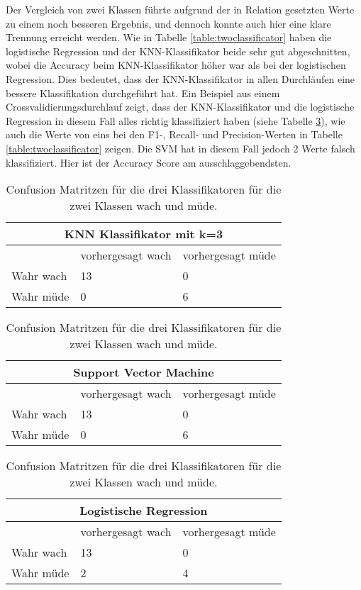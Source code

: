 Der Vergleich von zwei Klassen führte aufgrund der in Relation gesetzten Werte zu einem noch besseren Ergebnis, und dennoch konnte auch hier eine klare Trennung erreicht werden. Wie in Tabelle \ref{table:twoclassificator} haben die logistische Regression und der KNN-Klassifikator beide sehr gut abgeschnitten, wobei die Accuracy beim KNN-Klassifikator höher war als bei der logistischen Regression. Dies bedeutet, dass der KNN-Klassifikator in allen Durchläufen eine bessere Klassifikation durchgeführt hat. Ein Beispiel aus einem Crossvalidierungsdurchlauf zeigt, dass der KNN-Klassifikator und die logistische Regression in diesem Fall alles richtig klassifiziert haben (siehe Tabelle \ref{table:confusionmatrixtwoclasses}), wie auch die Werte von eins bei den F1-, Recall- und Precision-Werten in Tabelle \ref{table:twoclassificator} zeigen. Die SVM hat in diesem Fall jedoch 2 Werte falsch klassifiziert. Hier ist der Accuracy Score am ausschlaggebendsten.


\begin{table}
    \centering
    \begin{tabular}{|l|l|l|}
    \hline
    \multicolumn{3}{|c|}{KNN Klassifikator mit k=3} \\ \hline
    & vorhergesagt wach & vorhergesagt müde \\ \hline
    Wahr wach & 13 & 0 \\ \hline
    Wahr müde & 0 & 6 \\ \hline
    \end{tabular}
    
    \vspace{0.5cm} %
    
    \begin{tabular}{|l|l|l|}
    \hline
    \multicolumn{3}{|c|}{Support Vector Machine} \\ \hline
    & vorhergesagt wach & vorhergesagt müde \\ \hline
    Wahr wach & 13 & 0 \\ \hline
    Wahr müde & 0 & 6 \\ \hline
    \end{tabular}
    
    \vspace{0.5cm} %
    
    \begin{tabular}{|l|l|l|}
    \hline
    \multicolumn{3}{|c|}{Logistische Regression} \\ \hline
    & vorhergesagt wach & vorhergesagt müde \\ \hline
    Wahr wach & 13 & 0 \\ \hline
    Wahr müde & 2 & 4 \\ \hline
    \end{tabular}
\caption{Confusion Matritzen für die drei Klassifikatoren für die zwei Klassen wach und müde.}
\label{table:confusionmatrixtwoclasses}
\end{table}


